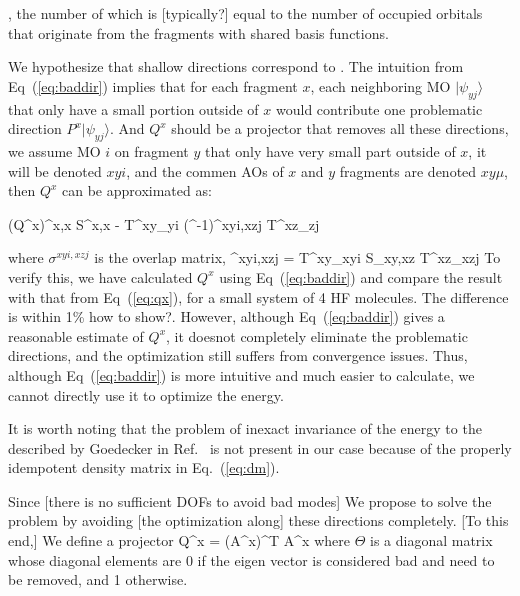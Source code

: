 \documentclass[aps,prl,twocolumn,reprint,amsmath,amssymb]{revtex4-1}
\begin{document}
, the number of which is [typically?] equal to the number of occupied orbitals that originate from the fragments with shared basis functions.

\label{marker:nature} We hypothesize that shallow directions correspond to . The intuition from Eq~(\ref{eq:baddir}) implies that for each fragment $x$, each neighboring MO $|\psi_{yj}\rangle$ that only have a small portion outside of $x$ would contribute one problematic direction $P^x | \psi_{yj}\rangle$. And $Q^x$ should be a projector that removes all these directions, we assume MO $i$ on fragment $y$ that only have very small part outside of $x$, it will be denoted $xyi$, and the commen AOs of $x$ and $y$ fragments are denoted $xy\mu$, then $Q^x$ can be approximated as:

\bea
(Q^x)^{x\mu,x\nu} \approx S^{x\mu,x\nu} - T^{xy\mu}_{yi} (\sigma^{-1})^{xyi,xzj} T^{xz\mu}_{zj}
\label{eq:approxq}
\eea

where $\sigma^{xyi,xzj}$ is the overlap matrix,
\bea
\sigma^{xyi,xzj} = T^{xy\mu}_{xyi} S_{xy\mu,xz\nu} T^{xz\nu}_{xzj}
\eea
To verify this, we have calculated $Q^x$ using Eq~(\ref{eq:baddir}) and compare the result with that from Eq~(\ref{eq:qx}), for a small system of 4 HF molecules. The difference is within 1\% \new how to show?\old. However, although Eq~(\ref{eq:baddir}) gives a reasonable estimate of $Q^x$, it doesnot completely eliminate the problematic directions, and the optimization still suffers from convergence issues. Thus, although Eq~(\ref{eq:baddir}) is more intuitive and much easier to calculate, we cannot directly use it to optimize the energy.

It is worth noting that the problem of inexact invariance of the energy to the  described by Goedecker in Ref.~ is not present in our case because of the properly idempotent density matrix in Eq.~(\ref{eq:dm}).


Since [there is no sufficient DOFs to avoid bad modes] We propose to solve the problem by avoiding [the optimization along] these directions completely. [To this end,] We define a projector
%
\bea
Q^x = (A^x)^T \Theta A^x \label{eq:qx}
\eea
%
where $\Theta$ is a diagonal matrix whose diagonal elements are 0 if the eigen vector is considered bad and need to be removed, and 1 otherwise. 


%
%
\end{document}
